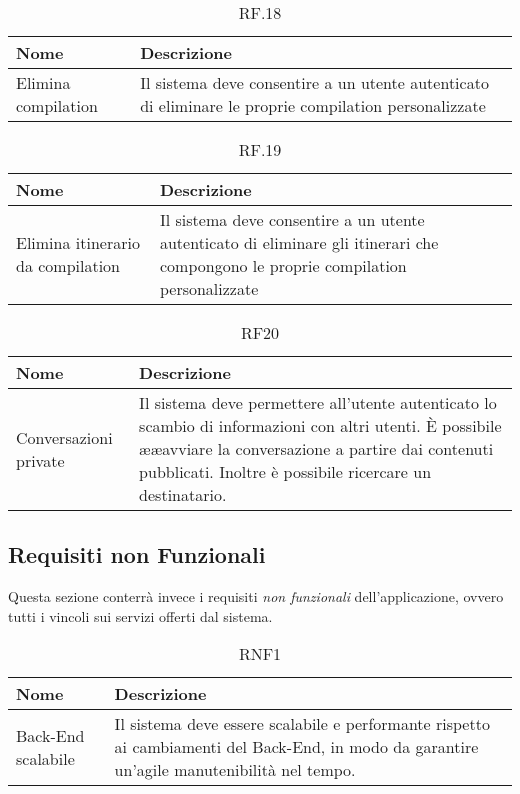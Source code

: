 \documentclass{natourDoc}
\begin{document}
	\begin{table}[H]
		\centering
		\begin{tabular}{ |p{5cm}|p{10.3cm}| }
			\hline
			\rowcolor{PineGreen!70}
			\textbf{Nome} & \textbf{Descrizione} \\
			\hline
			Elimina compilation & Il sistema deve consentire a un utente autenticato di eliminare le proprie
			compilation personalizzate \\
			\hline
		\end{tabular}
		\caption{RF.18}
		\label{table:18}
	\end{table}
	
	\begin{table}[H]
		\centering
		\begin{tabular}{ |p{5cm}|p{10.3cm}| }
			\hline
			\rowcolor{PineGreen!70}
			\textbf{Nome} & \textbf{Descrizione} \\
			\hline
			Elimina itinerario da compilation & Il sistema deve consentire a un utente autenticato di eliminare gli itinerari
			che compongono le proprie compilation personalizzate \\
			\hline
		\end{tabular}
		\caption{RF.19}
		\label{table:19}
	\end{table}

	\begin{table}[H]
		\centering
		\begin{tabular}{ |p{5cm}|p{10.3cm}| }
			\hline
			\rowcolor{PineGreen!70}
			\textbf{Nome} & \textbf{Descrizione} \\
			\hline
			Conversazioni private & Il sistema deve permettere all'utente autenticato lo scambio di informazioni con altri utenti.
			È possibile ææavviare la conversazione a partire dai contenuti pubblicati. Inoltre è possibile ricercare un destinatario. \\
			\hline
		\end{tabular}
		\caption{RF20}
		\label{table:20}
	\end{table}

	\newpage

	\subsection{Requisiti non Funzionali}
	Questa sezione conterrà invece i requisiti \textit{non funzionali} dell'applicazione, ovvero tutti i vincoli sui servizi offerti dal sistema.

	\begin{table}[H]
		\centering
		\begin{tabular}{ |p{5cm}|p{10.3cm}| } 
			\hline
			\rowcolor{PineGreen!70}
			\textbf{Nome} & \textbf{Descrizione} \\
			\hline
			Back-End scalabile & Il sistema deve essere scalabile e performante rispetto ai cambiamenti del Back-End,
			in modo da garantire un'agile manutenibilità nel tempo. \\
			\hline
		\end{tabular}
		\caption{RNF1}
		\label{table:21}
	\end{table}
	
\end{document}
